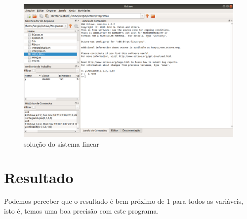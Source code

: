\documentclass[11pt, openright, a4paper, brazil, openany, oneside]{abntex2}
\begin{document}
\begin{figure}[h]

    \center

    \includegraphics[width=12cm]{octave3.png}
    \caption{solução do sistema linear \label{octave3}}
    
\end{figure}


\section{Resultado}

Podemos perceber que o resultado é bem próximo de 1 para todos as variáveis, isto é, temos uma boa precisão com este programa.


\newpage
\end{document}
